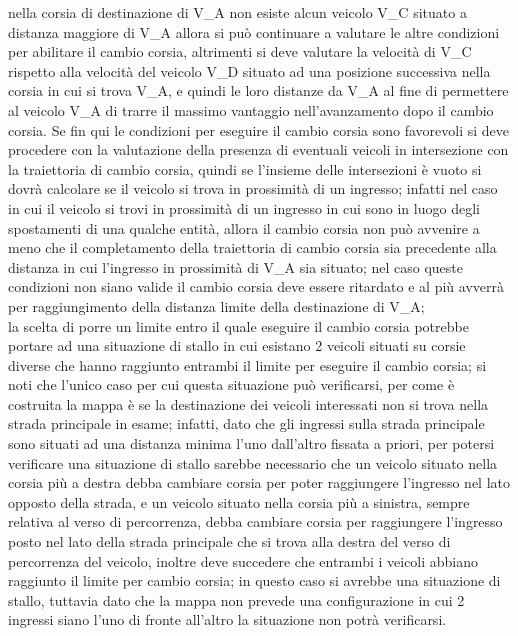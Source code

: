 \begin{enumerate}
\begin{enumerate}
nella corsia di destinazione di V\_A non esiste alcun veicolo V\_C situato a
distanza maggiore di V\_A allora si può continuare a valutare le altre
condizioni per abilitare il cambio corsia, altrimenti si deve valutare la
velocità di V\_C rispetto alla velocità del veicolo V\_D situato ad una
posizione successiva nella corsia in cui si trova V\_A, e quindi le loro
distanze da V\_A al fine di permettere al veicolo V\_A di trarre il massimo
vantaggio nell'avanzamento dopo il cambio corsia. Se fin qui le condizioni per
eseguire il cambio corsia sono favorevoli si deve procedere con la valutazione
della presenza di eventuali veicoli in intersezione con la traiettoria di
cambio corsia, quindi se l'insieme delle intersezioni è vuoto si dovrà
calcolare se il veicolo si trova in prossimità di un ingresso; infatti nel caso
in cui il veicolo si trovi in prossimità di un ingresso in cui sono in luogo
degli spostamenti di una qualche entità, allora il cambio corsia non può
avvenire a meno che il completamento della traiettoria di cambio corsia sia
precedente alla distanza in cui l'ingresso in prossimità di V\_A sia situato;
nel caso queste condizioni non siano valide il cambio corsia deve essere
ritardato e al più avverrà per raggiungimento della distanza limite della
destinazione di V\_A;\\
la scelta di porre un limite entro il quale eseguire il cambio corsia potrebbe
portare ad una situazione di stallo in cui esistano 2 veicoli situati su corsie
diverse che hanno raggiunto entrambi il limite per eseguire il cambio corsia;
si noti che l'unico caso per cui questa situazione può verificarsi, per come è
costruita la mappa è se la destinazione dei veicoli interessati non si trova
nella strada principale in esame; infatti, dato che gli ingressi sulla strada
principale sono situati ad una distanza minima l'uno dall'altro fissata a
priori, per potersi verificare una situazione di stallo sarebbe necessario che
un veicolo situato nella corsia più a destra debba cambiare corsia per poter
raggiungere l'ingresso nel lato opposto della strada, e un veicolo situato
nella corsia più a sinistra, sempre relativa al verso di percorrenza, debba
cambiare corsia per raggiungere l'ingresso posto nel lato della strada
principale che si trova alla destra del verso di percorrenza del veicolo,
inoltre deve succedere che entrambi i veicoli abbiano raggiunto il limite per
cambio corsia; in questo caso si avrebbe una situazione di stallo, tuttavia
dato che la mappa non prevede una configurazione in cui 2 ingressi siano l'uno
di fronte all'altro la situazione non potrà verificarsi. \\

\end{enumerate}
\end{enumerate}
